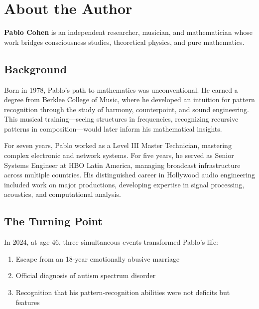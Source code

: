 \chapter*{About the Author}


\vspace{0.5cm}

\textbf{Pablo Cohen} is an independent researcher, musician, and mathematician whose work bridges consciousness studies, theoretical physics, and pure mathematics.

\section*{Background}

Born in 1978, Pablo's path to mathematics was unconventional. He earned a degree from Berklee College of Music, where he developed an intuition for pattern recognition through the study of harmony, counterpoint, and sound engineering. This musical training—seeing structures in frequencies, recognizing recursive patterns in composition—would later inform his mathematical insights.

For seven years, Pablo worked as a Level III Master Technician, mastering complex electronic and network systems. For five years, he served as Senior Systems Engineer at HBO Latin America, managing broadcast infrastructure across multiple countries. His distinguished career in Hollywood audio engineering included work on major productions, developing expertise in signal processing, acoustics, and computational analysis.

\section*{The Turning Point}

In 2024, at age 46, three simultaneous events transformed Pablo's life:

\begin{enumerate}
\item Escape from an 18-year emotionally abusive marriage
\item Official diagnosis of autism spectrum disorder
\item Recognition that his pattern-recognition abilities were not deficits but features
\end{enumerate}

